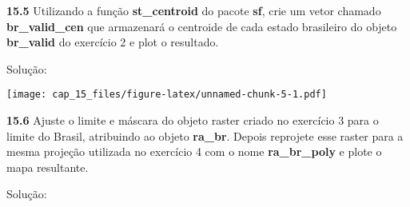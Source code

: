 \documentclass[
]{book}
\newenvironment{Shaded}{\begin{snugshade}}{\end{snugshade}}
\newcommand{\AttributeTok}[1]{\textcolor[rgb]{0.77,0.63,0.00}{#1}}
\newcommand{\ConstantTok}[1]{\textcolor[rgb]{0.00,0.00,0.00}{#1}}
\newcommand{\DecValTok}[1]{\textcolor[rgb]{0.00,0.00,0.81}{#1}}
\newcommand{\FunctionTok}[1]{\textcolor[rgb]{0.00,0.00,0.00}{#1}}
\newcommand{\NormalTok}[1]{#1}
\newcommand{\OtherTok}[1]{\textcolor[rgb]{0.56,0.35,0.01}{#1}}
\newcommand{\SpecialCharTok}[1]{\textcolor[rgb]{0.00,0.00,0.00}{#1}}
\newcommand{\StringTok}[1]{\textcolor[rgb]{0.31,0.60,0.02}{#1}}
\begin{document}
\textbf{15.5}
Utilizando a função \textbf{st\_centroid} do pacote \textbf{sf}, crie um vetor chamado \textbf{br\_valid\_cen} que armazenará o centroide de cada estado brasileiro do objeto \textbf{br\_valid} do exercício 2 e plot o resultado.

Solução:

\begin{Shaded}
\end{Shaded}

\texttt{[image: cap\_15\_files/figure-latex/unnamed-chunk-5-1.pdf]}

\textbf{15.6}
Ajuste o limite e máscara do objeto raster criado no exercício 3 para o limite do Brasil, atribuindo ao objeto \textbf{ra\_br}. Depois reprojete esse raster para a mesma projeção utilizada no exercício 4 com o nome \textbf{ra\_br\_poly} e plote o mapa resultante.

Solução:

\begin{Shaded}
\end{Shaded}
\end{document}
